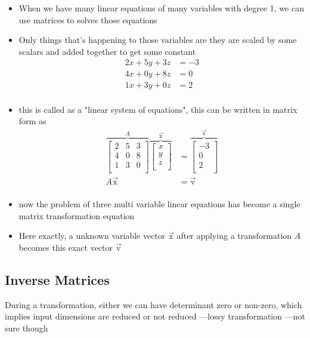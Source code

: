 \documentclass[a4paper]{article}
\begin{document}
\begin{itemize}
	\item When we have many linear equations of many variables with degree 1,
	      we can use matrices to solves those equations
	\item  Only things that's happening to those variables are they are
	      scaled by some scalars and added together to get some constant
	      \begin{align*}
		      2x + 5y + 3z & = -3 \\
		      4x + 0y + 8z & = 0  \\
		      1x + 3y + 0z & = 2  \\
	      \end{align*}
	\item this is called as a "linear system of equations", this can be
	      written in matrix form as
	      \begin{align*}
		      \overbrace{
			      \begin{bmatrix}
				      2 & 5 & 3 \\
				      4 & 0 & 8 \\
				      1 & 3 & 0 \\\end{bmatrix}
		      }^{A}
		      \overbrace{
			      \begin{bmatrix}
				      x \\ y \\ z \\ \end{bmatrix}
		      }^{\vec{\text{x}}}
		       & = \overbrace{
			      \begin{bmatrix}
				      -3 \\ 0  \\ 2 \\ \end{bmatrix}
		      }^{\vec{\text{v}}}  \\
		      A \vec{\text{x}}
		       & = \vec{\text{v}} \\
	      \end{align*}
	\item now the problem of three multi variable linear equations
	      has become a single matrix transformation equation
	\item Here exactly, a unknown variable vector $\vec{\text{x}}$
	      after applying a transformation $A$ becomes this exact
	      vector $\vec{\text{v}}$
\end{itemize}

\subsection{Inverse Matrices}
During a transformation, either we can have determinant zero or non-zero,
which implies input dimensions are reduced or not reduced
---lossy transformation ---not sure though
\end{document}
